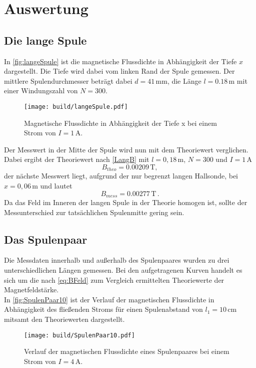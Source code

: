 \section{Auswertung}
\label{sec:Auswertung}

\subsection{Die lange Spule}
\label{sec:langeSpule}
In \autoref{fig:langeSpule} ist die magnetische Flussdichte in Abhängigkeit der Tiefe $x$ dargestellt. Die Tiefe
wird dabei vom linken Rand der Spule gemessen. Der mittlere Spulendurchmesser beträgt dabei $d=41 \, \unit{\milli\meter}$, 
die Länge $l=0.18 \, \unit{\meter}$ mit einer Windungszahl von $N=300$.
\begin{figure}[H]
    \centering
    \texttt{[image: build/langeSpule.pdf]}
    \caption{Magnetische Flussdichte in Abhängigkeit der Tiefe x bei einem Strom von $I= 1 \, \unit{\ampere}$.}
    \label{fig:langeSpule}
  \end{figure}

Der Messwert in der Mitte der Spule wird nun mit dem Theoriewert verglichen.
Dabei ergibt der Theoriewert nach \eqref{LangB} mit $l=0,18 \, \unit{\meter}$, $N=300$ und $I= 1\, \unit{\ampere}$
\begin{equation*}
  B_{theo}= 0.00209 \, \unit{\tesla},
\end{equation*}
der nächste Messwert liegt, aufgrund der nur begrenzt langen Hallsonde, bei $x=0,06\, \unit{\meter}$ und lautet
\begin{equation*}
  B_{mess} = 0.00277 \, \unit{\tesla}\,.
\end{equation*}
Da das Feld im Inneren der langen Spule in der Theorie homogen ist, sollte der Messunterschied zur tatsächlichen Spulenmitte
gering sein. 

\newpage

\subsection{Das Spulenpaar}
\label{sec:Spulenpaar}
Die Messdaten innerhalb und außerhalb des Spulenpaares wurden zu drei unterschiedlichen Längen gemessen. 
Bei den aufgetragenen Kurven handelt es sich um die nach \eqref{eq:BFeld} zum Vergleich ermittelten Theoriewerte
der Magnetfeldstärke. \\

In \autoref{fig:SpulenPaar10} ist der Verlauf der magnetischen Flussdichte in Abhängigkeit des fließenden Stroms
für einen Spulenabstand von $l_1= 10 \, \unit{\centi\meter}$ mitsamt den Theoriewerten dargestellt.
  \begin{figure}[H]
    \centering
    \texttt{[image: build/SpulenPaar10.pdf]}
    \caption{Verlauf der magnetischen Flussdichte eines Spulenpaares bei einem Strom von $I= 4 \, \unit{\ampere}$.}
    \label{fig:SpulenPaar10}
  \end{figure}

